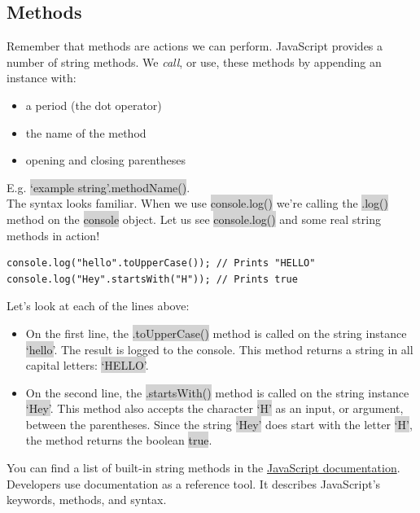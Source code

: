 \documentclass[11pt]{article}
\begin{document}
\subsection{Methods}
Remember that methods are actions we can perform. JavaScript provides a number of string methods. We \textit{call}, or use, these methods by appending an instance with:
\begin{itemize}[leftmargin = *]
\item a period (the dot operator)
\item the name of the method
\item opening and closing parentheses
\end{itemize}
E.g. \colorbox{lightgray}{`example string'.methodName()}. \\
The syntax looks familiar. When we use \colorbox{lightgray}{console.log()} we’re calling the \colorbox{lightgray}{.log()} method on the \colorbox{lightgray}{console} object. Let us see \colorbox{lightgray}{console.log()} and some real string methods in action!
\begin{lstlisting}
console.log("hello".toUpperCase()); // Prints "HELLO"
console.log("Hey".startsWith("H")); // Prints true
\end{lstlisting}
Let’s look at each of the lines above: 
\begin{itemize}[leftmargin = *]
\item On the first line, the \colorbox{lightgray}{.toUpperCase()} method is called on the string instance \colorbox{lightgray}{`hello'}. The result is logged to the console. This method returns a string in all capital letters: \colorbox{lightgray}{`HELLO'}.
\item On the second line, the \colorbox{lightgray}{.startsWith()} method is called on the string instance \colorbox{lightgray}{`Hey'}. This method also accepts the character \colorbox{lightgray}{`H'} as an input, or argument, between the parentheses. Since the string \colorbox{lightgray}{`Hey'} does start with the letter \colorbox{lightgray}{`H'}, the method returns the boolean \colorbox{lightgray}{true}.
\end{itemize}
You can find a list of built-in string methods in the \href{https://developer.mozilla.org/en-US/docs/Web/JavaScript/Reference/Global_Objects/String}{JavaScript documentation}. \\
Developers use documentation as a reference tool. It describes JavaScript’s keywords, methods, and syntax.
\end{document}
